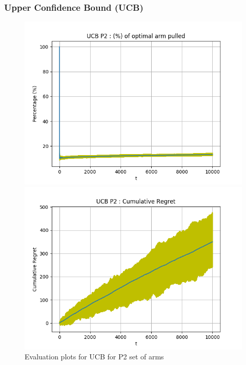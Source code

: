 \documentclass[12pt]{report}
\begin{document}
		\subsubsection{Upper Confidence Bound (UCB)}
			\begin{figure}[H]
				\begin{multicols}{2}
					\includegraphics[scale=0.5]{Figures/UCB_P2_op.png} \par
					\includegraphics[scale=0.5]{Figures/UCB_P2_ret.png}
				\end{multicols}
				\caption{Evaluation plots for UCB for P2 set of arms}
				\label{Fig3}
			\end{figure}
			
\end{document}
